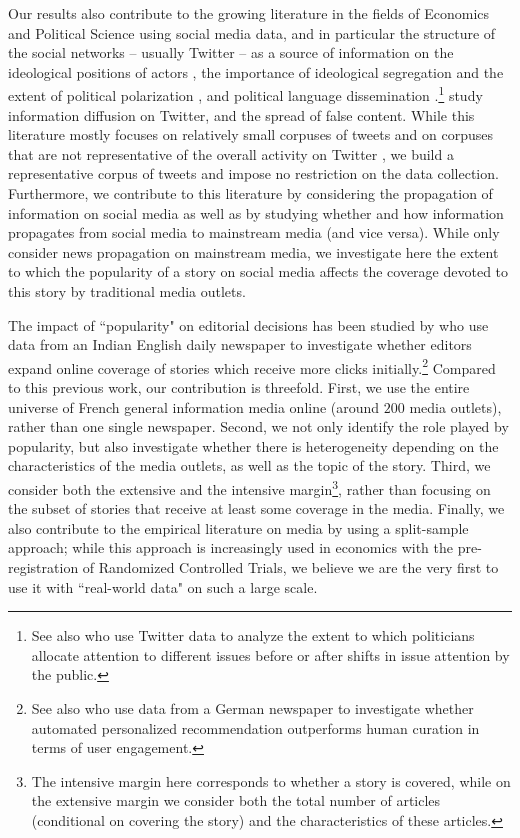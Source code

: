 Our results also contribute to the growing literature in the fields of Economics and Political Science using social media data, and in particular the structure of the social networks -- usually Twitter -- as a source of information on the ideological positions of actors \citep{Barbera2015,cardon2019unfolding}, the importance of ideological segregation and the extent of political polarization \citep{HalberstamKnight2016,Giavazzietal2020}, and political language dissemination \citep{Longhietal2019}.\footnote{See also \citet{Barberaetal2019} who use Twitter data to analyze the extent to which politicians allocate attention to different issues before or after shifts in issue attention by the public.} \citet{Gorodnichenkoetal2018} study information diffusion on Twitter, and \citet{AllcottGentzkowYu2019_ReasearchPolitics} the spread of false content. While this literature mostly focuses on relatively small corpuses of tweets and on corpuses that are not representative of the overall activity on Twitter \citep[e.g.][make requests to collect tweets using Brexit-related keywords]{Gorodnichenkoetal2018}, we build a representative corpus of tweets and impose no restriction on the data collection. Furthermore, we contribute to this literature by considering the propagation of information on social media as well as by studying whether and how information propagates from social media to mainstream media (and vice versa). While \citet{CageHerveViaud2020} only consider news propagation on mainstream media, we investigate here the extent to which the popularity of a story on social media affects the coverage devoted to this story by traditional media outlets.

The impact of ``popularity" on editorial decisions has been studied by \citet{SenYildirim2015} who use data from an Indian English daily newspaper to investigate whether editors expand online coverage of stories which receive more clicks initially.\footnote{See also \citet{ClaussenPeukertSen2019} who use data from a German newspaper to investigate whether automated personalized recommendation outperforms human curation in terms of user engagement.} Compared to this previous work, our contribution is threefold. First, we use the entire universe of French general information media online (around $200$ media outlets), rather than one single newspaper. Second, we not only identify the role played by popularity, but also investigate whether there is heterogeneity depending on the characteristics of the media outlets, as well as the topic of the story. Third, we consider both the extensive and the intensive  margin\footnote{The intensive margin here corresponds to whether a story is covered, while on the extensive margin we consider both the total number of articles (conditional on covering the story) and the characteristics of these articles.}, rather than focusing on the subset of stories that receive at least some coverage in the media. Finally, we also contribute to the empirical literature on media by using a split-sample approach; while this approach is increasingly used in economics with the pre-registration of Randomized Controlled Trials, we believe we are the very first to use it with ``real-world data" on such a large scale.

